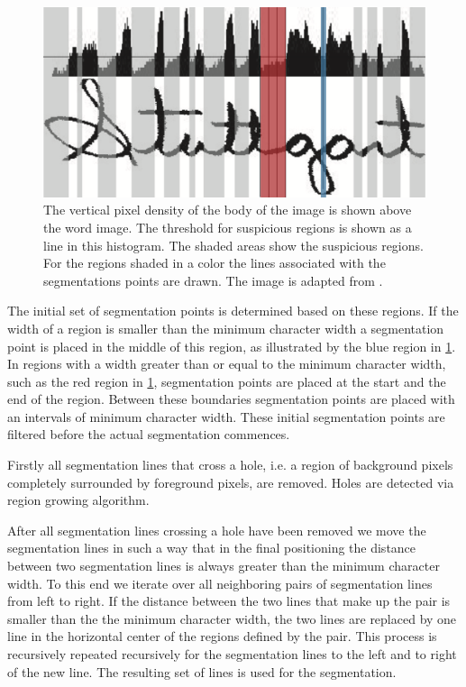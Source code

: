 	\begin{figure}
		\centering
		\includegraphics[width=\columnwidth]{shared/img/method/suspicious_regions.png}
		\caption{The vertical pixel density of the body of the image is shown above the word image.  The threshold for suspicious regions is shown as a line in this histogram. The shaded areas show the suspicious regions. For the regions shaded in a color the lines associated with the segmentations points are drawn. The image is adapted from \cite{lee2012binary}.}
		\label{fig:method:segmentation:suspiciousRegions}
	\end{figure}

	The initial set of segmentation points is determined based on these regions. If the width of a region is smaller than the minimum character width a segmentation point is placed in the middle of this region, as illustrated by the blue region in \cref{fig:method:segmentation:suspiciousRegions}. In regions with a width greater than or equal to the minimum character width, such as the red region in \cref{fig:method:segmentation:suspiciousRegions}, segmentation points are placed at the start and the end of the region. Between these boundaries segmentation points are placed with an intervals of minimum character width. These initial segmentation points are filtered before the actual segmentation commences.

	Firstly all segmentation lines that cross a hole, i.e. a region of background pixels completely surrounded by foreground pixels, are removed. Holes are detected via region growing algorithm. 

	After all segmentation lines crossing a hole have been removed we move the segmentation lines in such a way that in the final positioning the distance between two segmentation lines is always greater than the minimum character width. To this end we iterate over all neighboring pairs of segmentation lines from left to right. If the distance between the two lines that make up the pair is smaller than the the minimum character width, the two lines are replaced by one line in the horizontal center of the regions defined by the pair.  This process is recursively repeated recursively for the segmentation lines to the left and to right of the new line. The resulting set of lines is used for the segmentation.

